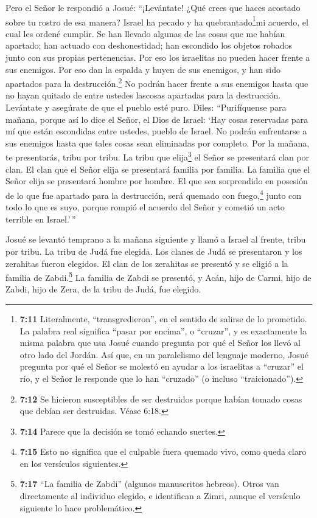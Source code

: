  Pero el Señor le respondió a Josué: ``¡Levántate! ¿Qué
crees que haces acostado sobre tu rostro de esa manera? 
Israel ha pecado y ha quebrantado\footnote{\textbf{7:11} Literalmente,
  ``transgredieron'', en el sentido de salirse de lo prometido. La
  palabra real significa ``pasar por encima'', o ``cruzar'', y es
  exactamente la misma palabra que usa Josué cuando pregunta por qué el
  Señor los llevó al otro lado del Jordán. Así que, en un paralelismo
  del lenguaje moderno, Josué pregunta por qué el Señor se molestó en
  ayudar a los israelitas a ``cruzar'' el río, y el Señor le responde
  que lo han ``cruzado'' (o incluso ``traicionado'').}mi acuerdo, el
cual les ordené cumplir. Se han llevado algunas de las cosas que me
habían apartado; han actuado con deshonestidad; han escondido los
objetos robados junto con sus propias pertenencias.  Por
eso los israelitas no pueden hacer frente a sus enemigos. Por eso dan la
espalda y huyen de sus enemigos, y han sido apartados para la
destrucción.\footnote{\textbf{7:12} Se hicieron susceptibles de ser
  destruidos porque habían tomado cosas que debían ser destruidas. Véase
  6:18.} No podrán hacer frente a sus enemigos hasta que no hayan
quitado de entre ustedes lascosas apartadas para la destrucción.
 Levántate y asegúrate de que el pueblo esté puro. Diles:
``Purifíquense para mañana, porque así lo dice el Señor, el Dios de
Israel: `Hay cosas reservadas para mí que están escondidas entre
ustedes, pueblo de Israel. No podrán enfrentarse a sus enemigos hasta
que tales cosas sean eliminadas por completo.  Por la
mañana, te presentarás, tribu por tribu. La tribu que elija\footnote{\textbf{7:14}
  Parece que la decisión se tomó echando suertes.} el Señor se
presentará clan por clan. El clan que el Señor elija se presentará
familia por familia. La familia que el Señor elija se presentará hombre
por hombre.  El que sea sorprendido en posesión de lo que
fue apartado para la destrucción, será quemado con fuego,\footnote{\textbf{7:15}
  Esto no significa que el culpable fuera quemado vivo, como queda claro
  en los versículos siguientes.} junto con todo lo que es suyo, porque
rompió el acuerdo del Señor y cometió un acto terrible en Israel.'\,''

 Josué se levantó temprano a la mañana siguiente y llamó a
Israel al frente, tribu por tribu.  La tribu de Judá fue
elegida. Los clanes de Judá se presentaron y los zerahitas fueron
elegidos. El clan de los zerahitas se presentó y se eligió a la familia
de Zabdi.\footnote{\textbf{7:17} ``La familia de Zabdi'' (algunos
  manuscritos hebreos). Otros van directamente al individuo elegido, e
  identifican a Zimri, aunque el versículo siguiente lo hace
  problemático.}  La familia de Zabdi se presentó, y Acán,
hijo de Carmi, hijo de Zabdi, hijo de Zera, de la tribu de Judá, fue
elegido.

